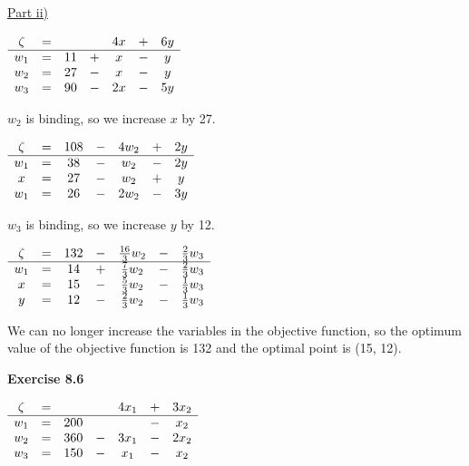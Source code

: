 \documentclass[letterpaper,12pt]{article}
\begin{document}
\underline{Part ii)}


\begin{center}
	$\begin{array}{ c c c c c c c c  }
	\zeta & = & & & 4x & + & 6y \\
	\hline
	w_1 & = & 11 & + & x & - & y \\
	w_2 & = & 27 & - & x & - & y \\
	w_3 & = & 90 & - & 2x & - & 5y \\
	\end{array}$ \\
\end{center}

$w_2$ is binding, so we increase $x$ by 27. \\

\begin{center}
	$\begin{array}{ c c c c c c c c  }
	\zeta & = & 108 & - & 4w_2 & + & 2y \\
	\hline
	w_1 & = & 38 & - & w_2 & - & 2y \\
	x & = & 27 & - & w_2 & + & y \\
	w_1 & = & 26 & - & 2w_2 & - & 3y \\
	\end{array}$ \\
\end{center}

$w_3$ is binding, so we increase $y$ by 12. \\

\begin{center}
	$\begin{array}{ c c c c c c c c  }
	\zeta & = & 132 & - & \tfrac{16}{3}w_2 & - & \tfrac{2}{3}w_3 \\
	\hline
	w_1 & = & 14 & + & \tfrac{7}{3}w_2 & - & \tfrac{2}{3}w_3 \\
	x & = & 15 & - & \tfrac{5}{3}w_2 & - & \tfrac{1}{3}w_3 \\
	y & = & 12 & - & \tfrac{2}{3}w_2 & - & \tfrac{1}{3}w_3\\
	\end{array}$
\end{center}

We can no longer increase the variables in the objective function, so the optimum value of the objective function is 132 and the optimal point is (15, 12).

\textbf{Exercise 8.6}


\begin{center}
	$\begin{array}{ c c c c c c c c  }
	\zeta & = & & & 4x_1 & + & 3x_2 \\
	\hline
	w_1 & = & 200 & & & - & x_2 \\
	w_2 & = & 360 & - & 3x_1 & - & 2x_2 \\
	w_3 & = & 150 & - & x_1 & - & x_2 \\
	\end{array}$ \\
\end{center}
\end{document}
